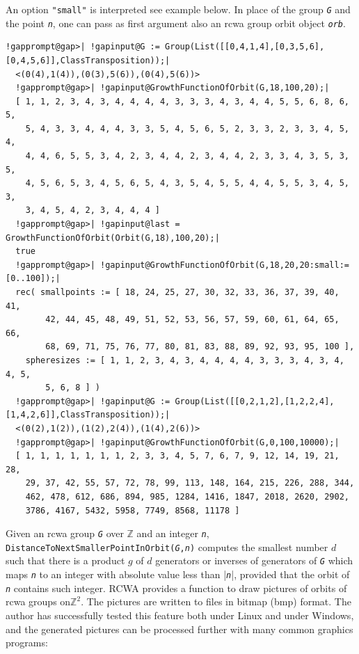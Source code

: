 \documentclass[a4paper,11pt]{report}
\begin{document}
{{{ An option \texttt{"small"} is interpreted \texttt{}\texttt{} see example below. In
place of the group \mbox{\texttt{\mdseries\slshape G}} and the point \mbox{\texttt{\mdseries\slshape n}}, one can pass as first argument also an rcwa group orbit object \mbox{\texttt{\mdseries\slshape orb}}. 
\begin{Verbatim}[commandchars=!@|,fontsize=\small,frame=single,label=Example]
  !gapprompt@gap>| !gapinput@G := Group(List([[0,4,1,4],[0,3,5,6],[0,4,5,6]],ClassTransposition));|
  <(0(4),1(4)),(0(3),5(6)),(0(4),5(6))>
  !gapprompt@gap>| !gapinput@GrowthFunctionOfOrbit(G,18,100,20);|
  [ 1, 1, 2, 3, 4, 3, 4, 4, 4, 4, 3, 3, 3, 4, 3, 4, 4, 5, 5, 6, 8, 6, 5, 
    5, 4, 3, 3, 4, 4, 4, 3, 3, 5, 4, 5, 6, 5, 2, 3, 3, 2, 3, 3, 4, 5, 4, 
    4, 4, 6, 5, 5, 3, 4, 2, 3, 4, 4, 2, 3, 4, 4, 2, 3, 3, 4, 3, 5, 3, 5, 
    4, 5, 6, 5, 3, 4, 5, 6, 5, 4, 3, 5, 4, 5, 5, 4, 4, 5, 5, 3, 4, 5, 3, 
    3, 4, 5, 4, 2, 3, 4, 4, 4 ]
  !gapprompt@gap>| !gapinput@last = GrowthFunctionOfOrbit(Orbit(G,18),100,20);|
  true
  !gapprompt@gap>| !gapinput@GrowthFunctionOfOrbit(G,18,20,20:small:=[0..100]);|
  rec( smallpoints := [ 18, 24, 25, 27, 30, 32, 33, 36, 37, 39, 40, 41, 
        42, 44, 45, 48, 49, 51, 52, 53, 56, 57, 59, 60, 61, 64, 65, 66, 
        68, 69, 71, 75, 76, 77, 80, 81, 83, 88, 89, 92, 93, 95, 100 ], 
    spheresizes := [ 1, 1, 2, 3, 4, 3, 4, 4, 4, 4, 3, 3, 3, 4, 3, 4, 4, 5, 
        5, 6, 8 ] )
  !gapprompt@gap>| !gapinput@G := Group(List([[0,2,1,2],[1,2,2,4],[1,4,2,6]],ClassTransposition));|
  <(0(2),1(2)),(1(2),2(4)),(1(4),2(6))>
  !gapprompt@gap>| !gapinput@GrowthFunctionOfOrbit(G,0,100,10000);|
  [ 1, 1, 1, 1, 1, 1, 1, 2, 3, 3, 4, 5, 7, 6, 7, 9, 12, 14, 19, 21, 28, 
    29, 37, 42, 55, 57, 72, 78, 99, 113, 148, 164, 215, 226, 288, 344, 
    462, 478, 612, 686, 894, 985, 1284, 1416, 1847, 2018, 2620, 2902, 
    3786, 4167, 5432, 5958, 7749, 8568, 11178 ]
\end{Verbatim}
 }

  Given an rcwa group \mbox{\texttt{\mdseries\slshape G}} over {\ensuremath{\mathbb Z}} and an integer \mbox{\texttt{\mdseries\slshape n}}, \texttt{DistanceToNextSmallerPointInOrbit(}\mbox{\texttt{\mdseries\slshape G}}\texttt{,}\mbox{\texttt{\mdseries\slshape n}}\texttt{)} computes the smallest number $d$ such that there is a product $g$ of $d$ generators or inverses of generators of \mbox{\texttt{\mdseries\slshape G}} which maps \mbox{\texttt{\mdseries\slshape n}} to an integer with absolute value less than |\mbox{\texttt{\mdseries\slshape n}}|, provided that the orbit of \mbox{\texttt{\mdseries\slshape n}} contains such integer. \textsf{RCWA} provides a function to draw pictures of orbits of rcwa groups
on{\nobreakspace}${\ensuremath{\mathbb Z}}^2$. The pictures are written to files in bitmap\texttt{}
(bmp\texttt{}) format. The author has successfully tested this
feature both under Linux and under Windows, and the generated pictures can be
processed further with many common graphics programs: 

}}
\end{document}
